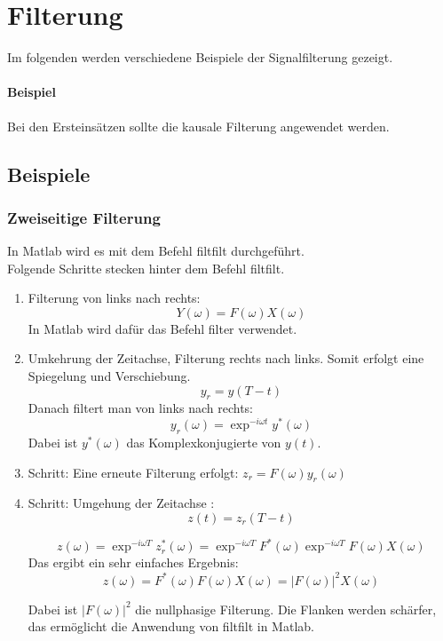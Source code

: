 
\chapter{Filterung}
Im folgenden werden verschiedene Beispiele der Signalfilterung gezeigt.


\subsubsection*{Beispiel} Bei den Ersteinsätzen sollte die kausale Filterung angewendet werden.

\section{Beispiele}

\subsection*{Zweiseitige Filterung} 
In Matlab wird es mit dem Befehl filtfilt durchgeführt.\\
Folgende Schritte stecken hinter dem Befehl filtfilt.
\begin{enumerate}
\item Filterung von links nach rechts:
\begin{equation}
Y(\omega) = F(\omega)X(\omega)
\end{equation}
In Matlab wird dafür das Befehl filter verwendet. \\
\item Umkehrung der Zeitachse, Filterung rechts nach links. Somit erfolgt eine Spiegelung und Verschiebung.
\begin{equation}
y_{r} = y(T-t)
\end{equation}
Danach filtert man von links nach rechts:
\begin{equation}
y_{r}(\omega) = \exp^{-i\omega t} y^*(\omega) 
\end{equation}
Dabei ist $y^*(\omega)$ das Komplexkonjugierte von $y(t)$.\\
\item Schritt: Eine erneute Filterung erfolgt: $z_{r}= F(\omega)y_{r}(\omega)$\\
\item Schritt: Umgehung der Zeitachse :
\begin{equation}
z(t)=z_{r}(T-t)
\end{equation}

\begin{equation}
z(\omega)=\exp^{-i\omega T}z_{r}^*(\omega) = \exp^{-i\omega T} F^*(\omega) \exp^{-i\omega T} F(\omega)X(\omega)
\end{equation}
Das ergibt ein sehr einfaches Ergebnis:
\begin{equation}
z(\omega)=   F^*(\omega) F(\omega)X(\omega) = \vert F(\omega) \vert^2 X(\omega)
\end{equation}

Dabei ist $\vert F(\omega) \vert^2$  die nullphasige Filterung. Die Flanken werden schärfer, das ermöglicht die Anwendung von filtfilt in Matlab.
\end{enumerate}

